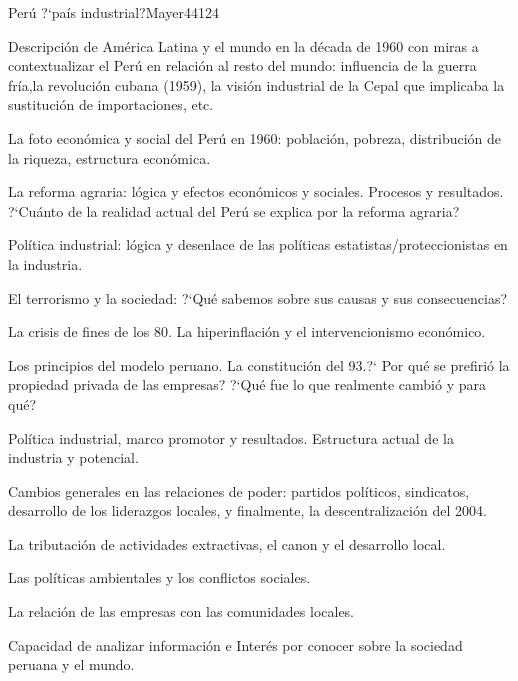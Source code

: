 \begin{syllabus}
\begin{unit}{Perú ?`país industrial?}{}{Mayer44}{12}{4}
   \begin{topics}
      \item Descripción de América Latina y el mundo en la década de 1960 con miras a contextualizar el Perú en relación al resto del mundo: influencia de la guerra fría,la revolución cubana (1959), la visión industrial de la Cepal que implicaba la sustitución de importaciones, etc.
      \item La foto económica y social del Perú en 1960: población, pobreza, distribución de la riqueza, estructura económica.
      \item La reforma agraria: lógica y efectos económicos y sociales. Procesos y resultados. ?`Cuánto de la realidad actual del Perú se explica por la reforma agraria?
      \item Política industrial: lógica y desenlace de las políticas estatistas/proteccionistas en la industria.
      \item El terrorismo y la sociedad: ?`Qué sabemos sobre sus causas y sus consecuencias?
      \item La crisis de fines de los 80. La hiperinflación y el intervencionismo económico.
      \item Los principios del modelo peruano. La constitución del 93.?` Por qué se prefirió la propiedad privada de las empresas? ?`Qué fue lo que realmente cambió y para qué?
      \item Política industrial, marco promotor y resultados. Estructura actual de la industria y potencial.
      \item Cambios generales en las relaciones de poder: partidos políticos, sindicatos, desarrollo de los liderazgos locales, y finalmente, la descentralización del 2004.
      \item La tributación de actividades extractivas, el canon y el desarrollo local.
      \item Las políticas ambientales y los conflictos sociales.
      \item La relación de las empresas con las comunidades locales.
   \end{topics}
   \begin{learningoutcomes}
      \item Capacidad de analizar información e Interés por conocer sobre la sociedad peruana y el mundo.
   \end{learningoutcomes}
\end{unit}



\begin{coursebibliography}
\end{coursebibliography}

\end{syllabus}
